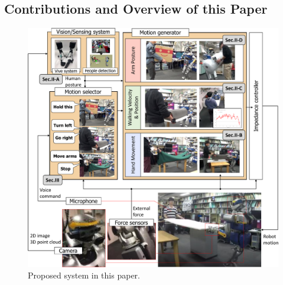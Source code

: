 \subsection{Contributions and Overview of this Paper}

\begin{figure}[htbp]
 \begin{center}
  \includegraphics[width=1.00\columnwidth]{figs/all_system2}
  \caption{Proposed system in this paper.}
  \label{figure:system}
 \end{center}
\end{figure}

